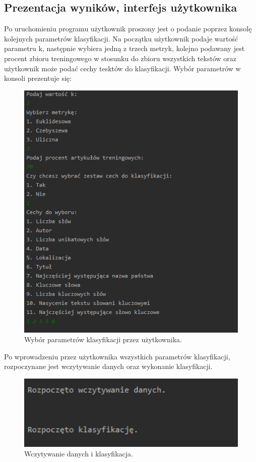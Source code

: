 \documentclass{classrep}
\begin{document}
\newpage

\subsection{Prezentacja wyników, interfejs użytkownika} 
Po uruchomieniu programu użytkownik proszony jest o podanie poprzez konsolę kolejnych parametrów klasyfikacji. Na początku użytkownik podaje wartość parametru k, następnie wybiera jedną z trzech metryk, kolejno podawany jest procent zbioru treningowego w stosunku do zbioru wszystkich tekstów oraz użytkownik może podać cechy tesktów do klasyfikacji. Wybór parametrów w konsoli prezentuje się:

\begin{figure}[h!]
 \centering
 \includegraphics[width=14cm]{Wybor.png}
 \vspace{-0.3cm}
 \caption{Wybór parametrów klasyfikacji przez użytkownika. }
 \label{Wybór parametrów klasyfikacji przez użytkownika. }
\end{figure}

\newpage
Po wprowadzeniu przez użytkownika wszystkich parametrów klasyfikacji, rozpoczynane jest wczytywanie danych oraz wykonanie klasyfikacji. 
\begin{figure}[h!]
 \centering
 \includegraphics[width=14cm]{srodek.png}
 \vspace{-0.3cm}
 \caption{Wczytywanie danych i klasyfikacja.}
 \label{Wczytywanie danych i klasyfikacja.}
\end{figure}
\end{document}
